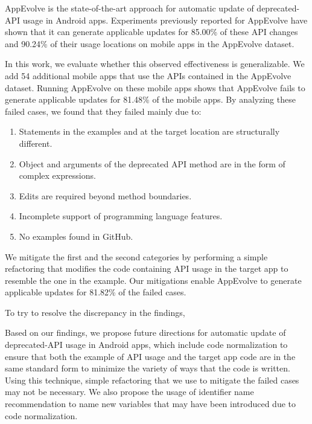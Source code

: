 AppEvolve is the state-of-the-art approach for automatic update of
deprecated-API usage in Android apps. Experiments previously reported for
AppEvolve have shown that it can generate applicable updates for
85.00\% of these API
changes and 90.24\% of their usage locations on mobile apps in the
AppEvolve dataset.

In this work, we evaluate whether this observed effectiveness is
generalizable. We add 54 additional mobile apps that use the APIs contained
in the AppEvolve dataset. Running AppEvolve on these mobile apps shows that
AppEvolve fails to generate applicable updates for 81.48\% of the mobile
apps. By analyzing these failed cases, we found that they failed mainly
due to:
\begin{enumerate}
    \item Statements in the examples and at the target location are structurally different.
    \item Object and arguments of the deprecated API method are in the form of complex expressions.
    \item Edits are required beyond method boundaries.
    \item Incomplete support of programming language features.
    \item No examples found in GitHub.
\end{enumerate}
We mitigate the first and the second categories by performing a simple
refactoring that modifies the code containing API usage in the target app
to resemble the one in the example. Our mitigations enable AppEvolve
to generate applicable updates for 81.82\% of the failed cases.

To try to resolve the discrepancy in the findings, 

Based on our findings, we propose future directions for automatic update of deprecated-API usage in Android apps, which include code normalization to ensure that both the example of API usage and the target app code are in the same standard form to minimize the variety of ways that the code is written. Using this technique, simple refactoring that we use to mitigate the failed cases may not be necessary. We also propose the usage of identifier name recommendation to name new variables that may have been introduced due to code normalization.

